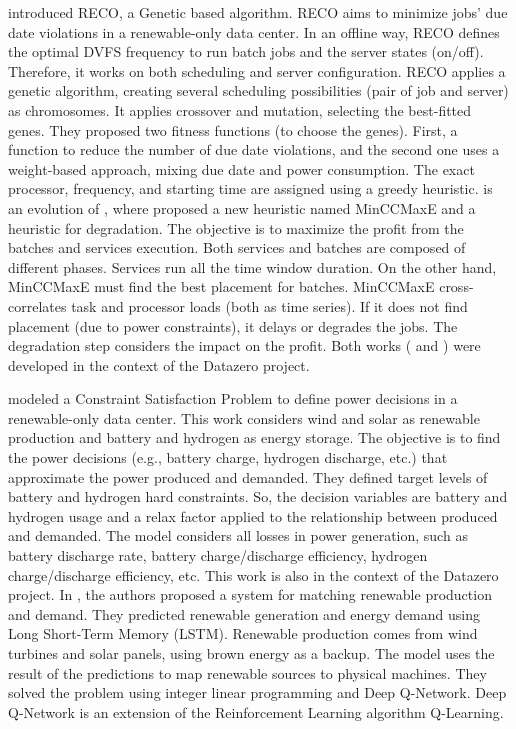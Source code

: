 \citeauthor{caux2018optimization} \cite{caux2018optimization} introduced RECO, a Genetic based algorithm. RECO aims to minimize jobs' due date violations in a renewable-only data center. In an offline way, RECO defines the optimal DVFS frequency to run batch jobs and the server states (on/off). Therefore, it works on both scheduling and server configuration. RECO applies a genetic algorithm, creating several scheduling possibilities (pair of job and server) as chromosomes. It applies crossover and mutation, selecting the best-fitted genes. They proposed two fitness functions (to choose the genes). First, a function to reduce the number of due date violations, and the second one uses a weight-based approach, mixing due date and power consumption. The exact processor, frequency, and starting time are assigned using a greedy heuristic. \cite{caux2019phase} is an evolution of \cite{caux2018optimization}, where \citeauthor{caux2019phase}  proposed a new heuristic named MinCCMaxE and a heuristic for degradation. The objective is to maximize the profit from the batches and services execution. Both services and batches are composed of different phases. Services run all the time window duration. On the other hand, MinCCMaxE must find the best placement for batches. MinCCMaxE cross-correlates task and processor loads (both as time series). If it does not find placement (due to power constraints), it delays or degrades the jobs. The degradation step considers the impact on the profit. Both works (\cite{caux2018optimization} and \cite{caux2019phase}) were developed in the context of the Datazero project.

\citeauthor{haddad2019mixed} \cite{haddad2019mixed} modeled a Constraint Satisfaction Problem to define power decisions in a renewable-only data center. This work considers wind and solar as renewable production and battery and hydrogen as energy storage. The objective is to find the power decisions (e.g., battery charge, hydrogen discharge, etc.) that approximate the power produced and demanded. They defined target levels of battery and hydrogen hard constraints. So, the decision variables are battery and hydrogen usage and a relax factor applied to the relationship between produced and demanded. The model considers all losses in power generation, such as battery discharge rate, battery charge/discharge efficiency, hydrogen charge/discharge efficiency, etc. This work is also in the context of the Datazero project. In \cite{gao2020smartly}, the authors proposed a system for matching renewable production and demand. They predicted renewable generation and energy demand using Long Short-Term Memory (LSTM). Renewable production comes from wind turbines and solar panels, using brown energy as a backup. The model uses the result of the predictions to map renewable sources to physical machines. They solved the problem using integer linear programming and Deep Q-Network. Deep Q-Network is an extension of the Reinforcement Learning algorithm Q-Learning. 


